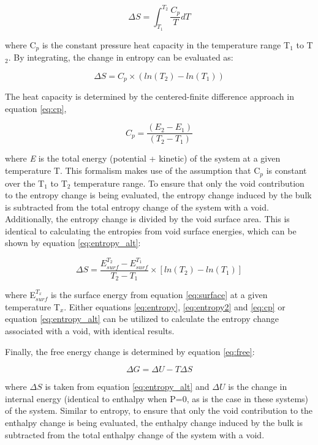 \documentclass[review]{elsarticle}
\begin{document}
\begin{equation}
\label{eq:entropy}
\Delta S = \int_{T_{1}}^{T_{2}} \frac{C_{p}}{T} dT
\end{equation}

where C$_{p}$ is the constant pressure heat capacity in the temperature range T$_{1}$ to T$_{2}$. By integrating, the change in entropy can be evaluated as:

\begin{equation}
\label{eq:entropy2}
\Delta S = C_{p} \times (ln(T_{2}) - ln(T_{1})) 
\end{equation}

The heat capacity is determined by the centered-finite difference approach in equation \ref{eq:cp},

\begin{equation}
\label{eq:cp}
C_{p} = \frac{(E_{2} - E_{1})}{(T_{2} - T_{1})} 
\end{equation}

where \textit{E} is the total energy (potential + kinetic) of the system at a given temperature T. This formalism makes use of the assumption that C$_{p}$ is constant over the T$_{1}$ to T$_{2}$ temperature range. To ensure that only the void contribution to the entropy change is being evaluated, the entropy change induced by the bulk is subtracted from the total entropy change of the system with a void. Additionally, the entropy change is divided by the void surface area. This is identical to calculating the entropies from void surface energies, which can be shown by equation \ref{eq:entropy_alt}:

\begin{equation}
\label{eq:entropy_alt}
\Delta S =\frac{ E_{surf}^{T_2} - E_{surf}^{T_1}}{T_2 - T_1} \times [ ln(T_2) - ln(T_1) ]
\end{equation}

where E$_{surf}^{T_{x}}$ is the surface energy from equation \ref{eq:surface} at a given temperature T$_x$. Either equations \ref{eq:entropy}, \ref{eq:entropy2} and \ref{eq:cp} or equation \ref{eq:entropy_alt} can be utilized to calculate the entropy change associated with a void, with identical results. 

Finally, the free energy change is determined by equation \ref{eq:free}:

\begin{equation}
\label{eq:free}
\Delta G = \Delta U - T \Delta S
\end{equation}

where $\Delta S$ is taken from equation \ref{eq:entropy_alt} and $\Delta U$ is the change in internal energy (identical to enthalpy when P=0, as is the case in these systems) of the system. Similar to entropy, to ensure that only the void contribution to the enthalpy change is being evaluated, the enthalpy change induced by the bulk is subtracted from the total enthalpy change of the system with a void.
\end{document}
